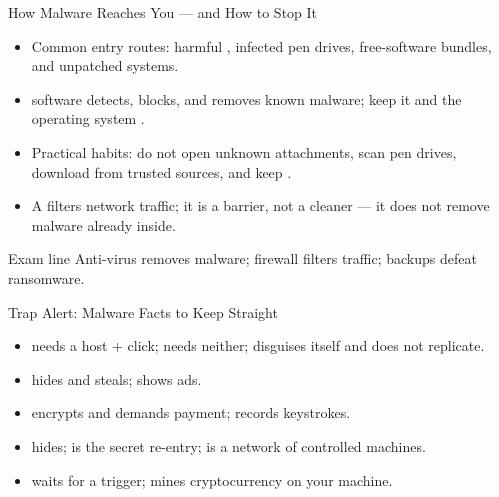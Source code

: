 \documentclass[aspectratio=169]{beamer}
\begin{document}
\begin{frame}{How Malware Reaches You --- and How to Stop It}
  \begin{itemize}
    \item Common entry routes: harmful ,
      infected pen drives, free-software bundles, and unpatched systems.
    \item {} software detects, blocks, and removes known
      malware; keep it and the operating system .
    \item Practical habits: do not open unknown attachments, scan pen
      drives, download from trusted sources, and keep .
    \item A  filters network traffic; it is a barrier, not a
      cleaner --- it does not remove malware already inside.
  \end{itemize}
  \begin{block}{Exam line}
    Anti-virus removes malware; firewall filters traffic; backups defeat
    ransomware.
  \end{block}
\end{frame}

\begin{frame}{Trap Alert: Malware Facts to Keep Straight}
  \begin{itemize}
    \item {} needs a host + click;  needs neither;
       disguises itself and does not replicate.
    \item {} hides and steals;  shows ads.
    \item {} encrypts and demands payment; 
      records keystrokes.
    \item {} hides;  is the secret re-entry;
       is a network of controlled machines.
    \item {} waits for a trigger;  mines
      cryptocurrency on your machine.
  \end{itemize}
\end{frame}
\end{document}
